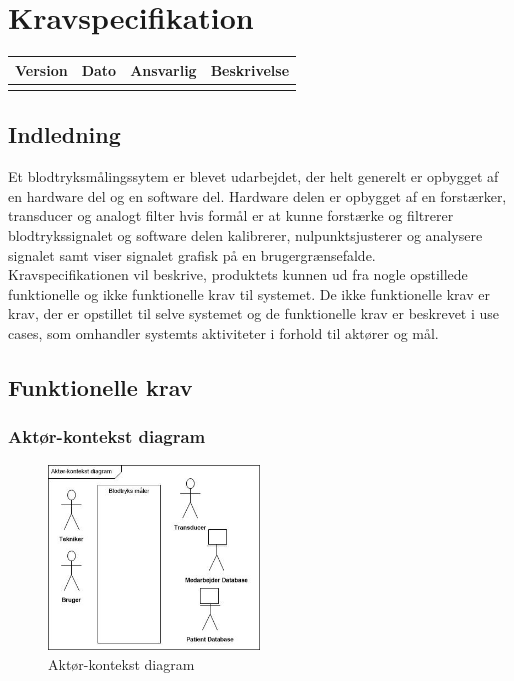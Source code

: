 \chapter{Kravspecifikation}

\begin{longtabu} to 
    Version &    Dato &    Ansvarlig &    Beskrivelse\\[-1ex]
    \midrule
\label{version_Systemark}
\end{longtabu}


\section{Indledning}
 Et blodtryksmålingssytem er blevet udarbejdet, der helt generelt er opbygget af en hardware del og en software del. Hardware delen er opbygget af en forstærker, transducer og analogt filter hvis formål er at kunne forstærke og filtrerer blodtrykssignalet og software delen kalibrerer, nulpunktsjusterer og analysere signalet samt viser signalet grafisk på en brugergrænsefalde. \\
 Kravspecifikationen vil beskrive, produktets kunnen ud fra nogle opstillede funktionelle og ikke funktionelle krav til systemet. De ikke funktionelle krav er krav, der er opstillet til selve systemet og de funktionelle krav er beskrevet i use cases, som omhandler systemts aktiviteter i forhold til aktører og mål. 


\section{Funktionelle krav}
\subsection{Aktør-kontekst diagram}

\begin{figure}[H]
	\centering
	\includegraphics[width=0.5\textwidth]{Figurer/ISE/aktdiagram}
	\caption{Aktør-kontekst diagram}
\end{figure}


